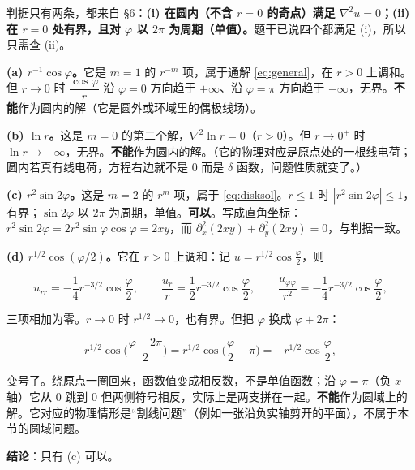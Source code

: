 \documentclass[11pt]{ctexart}
\begin{document}

判据只有两条，都来自 \S6：\textbf{(i) 在圆内（不含 $r=0$ 的奇点）满足 $\nabla^2u=0$；(ii) 在 $r=0$ 处有界，且对 $\varphi$ 以 $2\pi$ 为周期（单值）。}题干已说四个都满足 (i)，所以只需查 (ii)。

\textbf{(a) $r^{-1}\cos\varphi$。}它是 $m=1$ 的 $r^{-m}$ 项，属于通解 \eqref{eq:general}，在 $r>0$ 上调和。但 $r\to0$ 时 $\dfrac{\cos\varphi}{r}$ 沿 $\varphi=0$ 方向趋于 $+\infty$、沿 $\varphi=\pi$ 方向趋于 $-\infty$，无界。\textbf{不能}作为圆内的解（它是圆外或环域里的偶极线场）。

\textbf{(b) $\ln r$。}这是 $m=0$ 的第二个解，$\nabla^2\ln r=0$（$r>0$）。但 $r\to0^+$ 时 $\ln r\to-\infty$，无界。\textbf{不能}作为圆内的解。（它的物理对应是原点处的一根线电荷；圆内若真有线电荷，方程右边就不是 $0$ 而是 $\delta$ 函数，问题性质就变了。）

\textbf{(c) $r^2\sin2\varphi$。}这是 $m=2$ 的 $r^m$ 项，属于 \eqref{eq:disksol}。$r\le1$ 时 $|r^2\sin2\varphi|\le1$，有界；$\sin2\varphi$ 以 $2\pi$ 为周期，单值。\textbf{可以}。写成直角坐标：$r^2\sin2\varphi=2r^2\sin\varphi\cos\varphi=2xy$，而 $\partial_x^2(2xy)+\partial_y^2(2xy)=0$，与判据一致。

\textbf{(d) $r^{1/2}\cos(\varphi/2)$。}它在 $r>0$ 上调和：记 $u=r^{1/2}\cos\frac\varphi2$，则

\[
u_{rr}=-\frac14r^{-3/2}\cos\frac\varphi2,\qquad
\frac{u_r}{r}=\frac12r^{-3/2}\cos\frac\varphi2,\qquad
\frac{u_{\varphi\varphi}}{r^2}=-\frac14r^{-3/2}\cos\frac\varphi2,
\]

三项相加为零。$r\to0$ 时 $r^{1/2}\to0$，也有界。但把 $\varphi$ 换成 $\varphi+2\pi$：

\[
r^{1/2}\cos\Big(\frac{\varphi+2\pi}{2}\Big)=r^{1/2}\cos\Big(\frac\varphi2+\pi\Big)=-r^{1/2}\cos\frac\varphi2 ,
\]

变号了。绕原点一圈回来，函数值变成相反数，不是单值函数；沿 $\varphi=\pi$（负 $x$ 轴）它从 $0$ 跳到 $0$ 但两侧符号相反，实际上是两支拼在一起。\textbf{不能}作为圆域上的解。它对应的物理情形是“割线问题”（例如一张沿负实轴剪开的平面），不属于本节的圆域问题。

\textbf{结论}：只有 (c) 可以。

\end{document}
